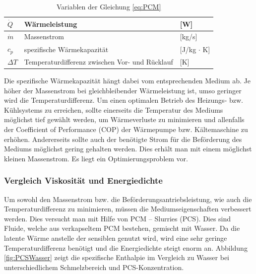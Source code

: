 \documentclass[11pt,a4paper]{scrartcl}
\begin{document}
\begin{table}[h!]
\begin{center}
\caption{Variablen der Gleichung \ref{eq:PCM}}
\begin{tabular}{|l|l|l|}
\hline $\dot{Q}$ & Wärmeleistung & [W] \\
\hline $\dot{m}$ & Massenstrom & [kg/s] \\
\hline $c_p$ & spezifische Wärmekapazität & [J/kg $\cdot$ K] \\
\hline $\Delta T$ & Temperaturdifferenz zwischen Vor- und Rücklauf & [K] \\
\hline
\end{tabular}
\end{center}
\end{table}
Die spezifische Wärmekapazität hängt dabei vom entsprechenden Medium ab. Je
höher der Massenstrom bei gleichbleibender Wärmeleistung ist, umso geringer wird
die Temperaturdifferenz. Um einen optimalen Betrieb des Heizungs- bzw. Kühlsystems
zu erreichen, sollte einerseits die Temperatur des Mediums möglichst tief
gewählt werden, um Wärmeverluste zu minimieren und allenfalls der Coefficient of
Performance (COP) der Wärmepumpe bzw. Kältemaschine zu erhöhen. Andererseits
sollte auch der benötigte Strom für die Beförderung des Mediums möglichst gering
gehalten werden. Dies erhält man mit einem möglichst kleinen Massenstrom. Es
liegt ein Optimierungsproblem vor.

\subsubsection{Vergleich Viskosität und Energiedichte}
Um sowohl den Massenstrom bzw. die Beförderungsantriebsleistung, wie auch die
Temperaturdifferenz zu minimieren, müssen die Mediumseigenschaften
verbessert werden. Dies versucht man mit Hilfe von PCM – Slurries (PCS). Dies
sind Fluide, welche aus verkapseltem PCM bestehen, gemischt mit Wasser. Da die
latente Wärme anstelle der sensiblen genutzt wird, wird eine sehr geringe
Temperaturdifferenz benötigt und die Energiedichte steigt enorm an.
Abbildung \ref{fig:PCSWasser} zeigt die spezifische Enthalpie im Vergleich zu
Wasser bei unterschiedlichem Schmelzbereich und PCS-Konzentration.
\end{document}
